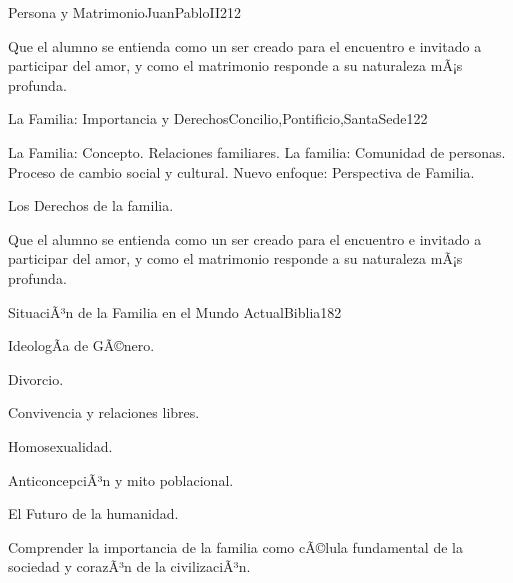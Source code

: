 \begin{syllabus}
\begin{unit}{Persona y Matrimonio}{JuanPabloII}{21}{2}
\begin{unitgoals}
	\item Que el alumno se entienda como un ser creado para el encuentro e invitado a participar del amor, y como el matrimonio responde a su naturaleza mÃ¡s profunda.  
\end{unitgoals}
\end{unit}

\begin{unit}{La Familia: Importancia y Derechos}{Concilio,Pontificio,SantaSede}{12}{2}
\begin{topics}
	\item La Familia: Concepto. Relaciones familiares. La familia: Comunidad de personas. Proceso de cambio social y cultural. Nuevo enfoque: Perspectiva de Familia.
	\item Los Derechos de la familia.	
\end{topics}

\begin{unitgoals}
	\item Que el alumno se entienda como un ser creado para el encuentro e invitado a participar del amor, y como el matrimonio responde a su naturaleza mÃ¡s profunda.  
\end{unitgoals}
\end{unit}

\begin{unit}{SituaciÃ³n de la Familia en el Mundo Actual}{Biblia}{18}{2}
\begin{topics}
	\item IdeologÃ­a de GÃ©nero.
	\item Divorcio.
	\item Convivencia y relaciones libres.
	\item Homosexualidad.
	\item AnticoncepciÃ³n y mito poblacional.
	\item El Futuro de la humanidad.

\end{topics}

\begin{unitgoals}
	\item Comprender la importancia de la familia como cÃ©lula fundamental de la sociedad y corazÃ³n de la civilizaciÃ³n.
\end{unitgoals}
\end{unit}



\begin{coursebibliography}
\end{coursebibliography}

\end{syllabus}

